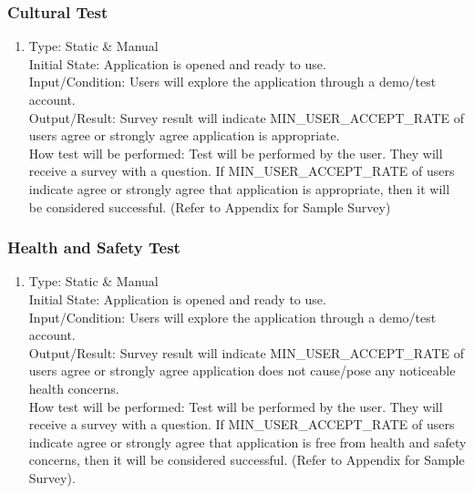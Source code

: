 \documentclass[12pt, titlepage]{article}
\begin{document}
\subsubsection{Cultural Test}

\begin{adjustwidth}{2.2em}{0pt}
\begin{enumerate}[{NF-CT}1.]
    \item Type: Static \& Manual\\
    Initial State: Application is opened and ready to use.\\
    Input/Condition: Users will explore the application through a demo/test account. \\
    Output/Result: Survey result will indicate MIN\_USER\_ACCEPT\_RATE of users agree or strongly agree application is appropriate.\\
    How test will be performed: Test will be performed by the user. They will receive a survey with a question. If MIN\_USER\_ACCEPT\_RATE of users indicate agree or strongly agree that application is appropriate, then it will be considered successful. (Refer to Appendix for Sample Survey)
\end{enumerate}
\end{adjustwidth}

\subsubsection{Health and Safety Test}

\begin{adjustwidth}{2.2em}{0pt}
\begin{enumerate}[{NF-HT}1.]
    \item Type: Static \& Manual\\
    Initial State: Application is opened and ready to use.\\
    Input/Condition: Users will explore the application through a demo/test account. \\
    Output/Result: Survey result will indicate MIN\_USER\_ACCEPT\_RATE of users agree or strongly agree application does not cause/pose any noticeable health concerns.\\
    How test will be performed: Test will be performed by the user. They will receive a survey with a question. If MIN\_USER\_ACCEPT\_RATE of users indicate agree or strongly agree that application is free from health and safety concerns, then it will be considered successful. (Refer to Appendix for Sample Survey).  
\end{enumerate}
\end{adjustwidth}
\end{document}
